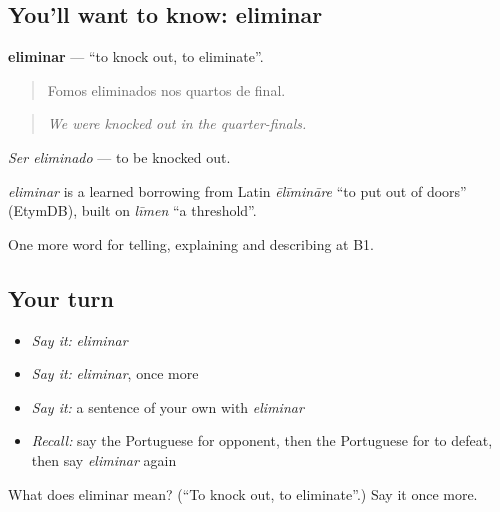 \subsection*{You'll want to know: eliminar}
\textbf{eliminar} — \textquotedblleft{}to knock out, to eliminate\textquotedblright{}.

\begin{quote}
Fomos eliminados nos quartos de final.
\end{quote}

\begin{quote}
\emph{We were knocked out in the quarter-finals.}
\end{quote}

\emph{Ser eliminado} — to be knocked out.

\begin{cousinweb}
\emph{eliminar} is a learned borrowing from Latin \emph{ēlīmināre} \textquotedblleft{}to put out of doors\textquotedblright{} (EtymDB), built on \emph{līmen} \textquotedblleft{}a threshold\textquotedblright{}.
\end{cousinweb}

\begin{grammarlens}[title={What you've built}]
One more word for telling, explaining and describing at B1.
\end{grammarlens}

\subsection*{Your turn}
\begin{itemize}
\raggedright
  \item \emph{Say it:} \emph{eliminar}
  \item \emph{Say it:} \emph{eliminar}, once more
  \item \emph{Say it:} a sentence of your own with \emph{eliminar}
  \item \emph{Recall:} say the Portuguese for opponent, then the Portuguese for to defeat, then say \emph{eliminar} again
\end{itemize}

\begin{tcolorbox}[breakable,colback=teal!4,colframe=teal!35!black,title={Before you move on}]
What does eliminar mean? (\textquotedblleft{}To knock out, to eliminate\textquotedblright{}.) Say it once more.
\end{tcolorbox}
